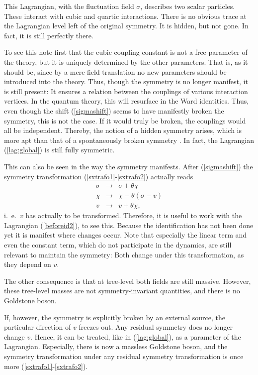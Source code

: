 \documentclass[final,12pt,3p,longtitle]{elsarticle}
\newcommand*{\no}{\noindent}
\newcommand*{\bea}{\begin{eqnarray}}
\newcommand*{\eea}{\end{eqnarray}}
\newcommand*{\pref}[1]{(\ref{#1})}
\newcommand*{\prefr}[2]{(\ref{#1}-\ref{#2})}
\newcommand*{\nn}{\nonumber}
\newcommand*{\1}{1\!\!\!\bot}
\begin{document}
This Lagrangian, with the fluctuation field $\sigma$, describes two scalar particles. These interact with cubic and quartic interactions. There is no obvious trace at the Lagrangian level left of the original symmetry. It is hidden, but not gone. In fact, it is still perfectly there. 

To see this note first that the cubic coupling constant is not a free parameter of the theory, but it is uniquely determined by the other parameters. That is, as it should be, since by a mere field translation no new parameters should be introduced into the theory. Thus, though the symmetry is no longer manifest, it is still present: It ensures a relation between the couplings of various interaction vertices. In the quantum theory, this will resurface in the Ward identities. Thus, even though the shift \pref{sigmashift} seems to have manifestly broken the symmetry, this is not the case. If it would truly be broken, the couplings would all be independent. Thereby, the notion of a hidden symmetry arises, which is more apt than that of a spontaneously broken symmetry \cite{O'Raifeartaigh:1978kv}. In fact, the Lagrangian \pref{lag:global} is still fully symmetric.

This can also be seen in the way the symmetry manifests. After \pref{sigmashift} the symmetry transformation \prefr{sxtrafo1}{sxtrafo2} actually reads
\bea
\sigma&\to&\sigma+\theta\chi\nn\\
\chi&\to&\chi-\theta(\sigma-v)\nn\\
v&\to&v+\theta\chi\nn,
\eea
\no i.\ e.\ $v$ has actually to be transformed. Therefore, it is useful to work with the Lagrangian \pref{beforeid2}, to see this. Because the identification has not been done yet it is manifest where changes occur. Note that especially the linear term and even the constant term, which do not participate in the dynamics, are still relevant to maintain the symmetry: Both change under this transformation, as they depend on $v$.

The other consequence is that at tree-level both fields are still massive. However, these tree-level masses are not symmetry-invariant quantities, and there is no Goldstone boson.

If, however, the symmetry is explicitly broken by an external source, the particular direction of $v$ freezes out. Any residual symmetry does no longer change $v$. Hence, it can be treated, like in \pref{lag:global}, as a parameter of the Lagrangian. Especially, there is now a massless Goldstone boson, and the symmetry transformation under any residual symmetry transformation is once more \prefr{sxtrafo1}{sxtrafo2}.
\end{document}
